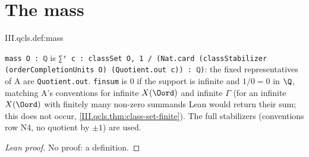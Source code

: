 \section{The mass}\label{sec:qcls-mass}

\begin{definition}[mass]
\end{definition}
\begin{tfformal}{III.qcls.def:mass}
\begin{tffidelity}
\texttt{mass O : ℚ} is \texttt{∑ᶠ c : classSet O, 1 / (Nat.card (classStabilizer (orderCompletionUnits O) (Quotient.out c)) : ℚ)}: the fixed representatives of A are \texttt{Quotient.out}. \texttt{finsum} is $0$ if the support is infinite and $1/0=0$ in $\Q$, matching A's conventions for infinite $X(\Oord)$ and infinite $\Gamma$ (for an infinite $X(\Oord)$ with finitely many non-zero summands Lean would return their sum; this does not occur, \cref{III.qcls.thm:class-set-finite}). The full stabilizers (conventions row N4, no quotient by $\pm1$) are used.
\end{tffidelity}
\end{tfformal}
\begin{proof}[Lean proof]
No proof: a definition.
\end{proof}


